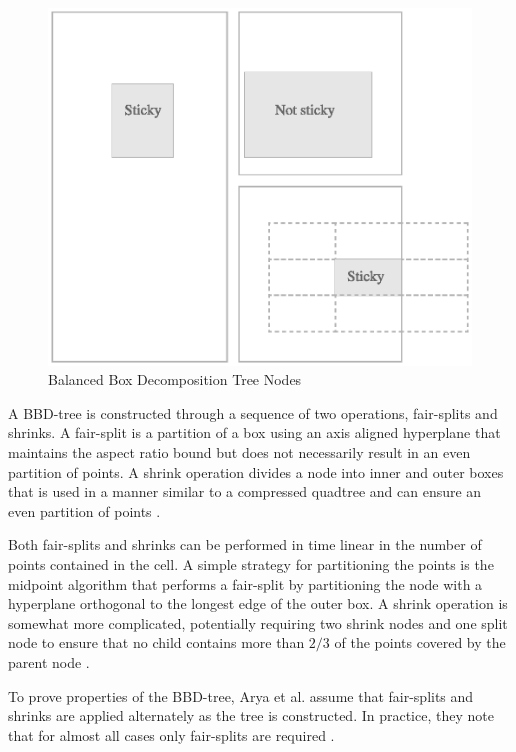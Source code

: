 \documentclass[mcs]{scsthesis}
\begin{document}
\begin{figure}
\begin{center}
\includegraphics[scale=0.5]{diagrams/bbd_tree_node.eps}
\caption{Balanced Box Decomposition Tree Nodes}
\label{fig:bbd_tree_node.eps_finite_tree}
\end{center}
\end{figure}

A BBD-tree is constructed through a sequence of two operations, fair-splits
and shrinks. A fair-split is a partition of a box using an axis aligned
hyperplane that maintains the aspect ratio bound but does not necessarily
result in an even partition of points. A shrink operation divides a node into
inner and outer boxes that is used in a manner similar to a compressed
quadtree and can ensure an even partition of points \cite{optimalann}.

Both fair-splits and shrinks can be performed in time linear in the number of
points contained in the cell. A simple strategy for partitioning the points is
the midpoint algorithm that performs a fair-split by partitioning the node
with a hyperplane orthogonal to the longest edge of the outer box. A shrink
operation is somewhat more complicated, potentially requiring two shrink nodes
and one split node to ensure that no child contains more than \(2/3\) of the
points covered by the parent node \cite{optimalann}.

To prove properties of the BBD-tree, Arya et al. assume that fair-splits and
shrinks are applied alternately as the tree is constructed. In practice, they
note that for almost all cases only fair-splits are required \cite{optimalann}. 
\end{document}
